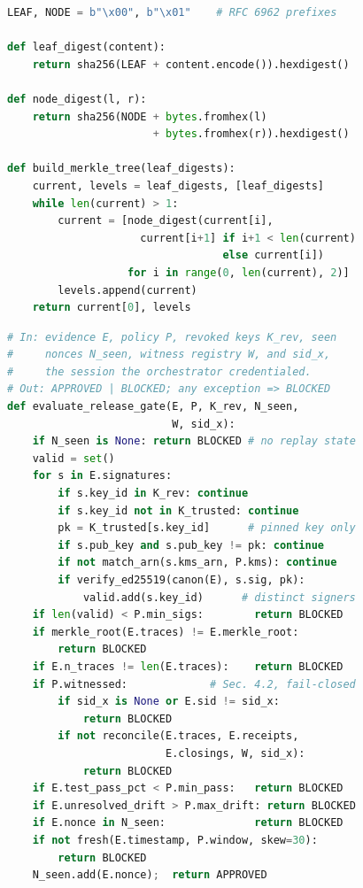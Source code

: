 \documentclass[letterpaper,10pt,twocolumn]{article}
\theoremstyle{definition}
\begin{document}
\begin{lstlisting}[language=python,caption={Merkle Trace Aggregation Protocol.},label={lst:proto1}]
LEAF, NODE = b"\x00", b"\x01"    # RFC 6962 prefixes

def leaf_digest(content):
    return sha256(LEAF + content.encode()).hexdigest()

def node_digest(l, r):
    return sha256(NODE + bytes.fromhex(l)
                       + bytes.fromhex(r)).hexdigest()

def build_merkle_tree(leaf_digests):
    current, levels = leaf_digests, [leaf_digests]
    while len(current) > 1:
        current = [node_digest(current[i],
                     current[i+1] if i+1 < len(current)
                                  else current[i])
                   for i in range(0, len(current), 2)]
        levels.append(current)
    return current[0], levels
\end{lstlisting}


\begin{lstlisting}[language=python,caption={Fail-Closed Policy Gate Verification Protocol.},label={lst:proto2}]
# In: evidence E, policy P, revoked keys K_rev, seen
#     nonces N_seen, witness registry W, and sid_x,
#     the session the orchestrator credentialed.
# Out: APPROVED | BLOCKED; any exception => BLOCKED
def evaluate_release_gate(E, P, K_rev, N_seen,
                          W, sid_x):
    if N_seen is None: return BLOCKED # no replay state
    valid = set()
    for s in E.signatures:
        if s.key_id in K_rev: continue
        if s.key_id not in K_trusted: continue
        pk = K_trusted[s.key_id]      # pinned key only
        if s.pub_key and s.pub_key != pk: continue
        if not match_arn(s.kms_arn, P.kms): continue
        if verify_ed25519(canon(E), s.sig, pk):
            valid.add(s.key_id)      # distinct signers
    if len(valid) < P.min_sigs:        return BLOCKED
    if merkle_root(E.traces) != E.merkle_root:
        return BLOCKED
    if E.n_traces != len(E.traces):    return BLOCKED
    if P.witnessed:             # Sec. 4.2, fail-closed
        if sid_x is None or E.sid != sid_x:
            return BLOCKED
        if not reconcile(E.traces, E.receipts,
                         E.closings, W, sid_x):
            return BLOCKED
    if E.test_pass_pct < P.min_pass:   return BLOCKED
    if E.unresolved_drift > P.max_drift: return BLOCKED
    if E.nonce in N_seen:              return BLOCKED
    if not fresh(E.timestamp, P.window, skew=30):
        return BLOCKED
    N_seen.add(E.nonce);  return APPROVED
\end{lstlisting}
\end{document}
